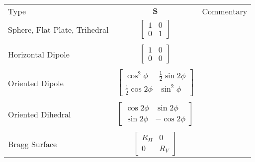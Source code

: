 \documentclass[11pt]{article}
\begin{document}
\begin{table}[hb]
	\centering
	\begin{tabular}{lcl}
		\hline
		Type & $\mathbf{S}$ & Commentary\\
		Sphere, Flat Plate, Trihedral & 
		$\begin{bmatrix}
			1 & 0\\
			0 & 1
		\end{bmatrix}$\\\\
		Horizontal Dipole & 
		$\begin{bmatrix}
			1 & 0\\
			0 & 0
		\end{bmatrix}$\\\\
		Oriented Dipole &
		$\begin{bmatrix}
			\cos^{2}{\phi} & \frac{1}{2}\sin{2\phi}\\
			\frac{1}{2}\cos{2\phi} & \sin^{2}{\phi}
		\end{bmatrix}$\\\\
		Oriented Dihedral &		
		$\begin{bmatrix}
			\cos{2\phi} & \sin{2\phi}\\
			\sin{2\phi} & -\cos{2\phi}
		\end{bmatrix}$\\\\
		Bragg Surface &
		$\begin{bmatrix}
			R_{H} & 0\\
			0 & R_{V}
		\end{bmatrix}$\\
	\end{tabular}
\end{table}
\FloatBarrier
\end{document}
